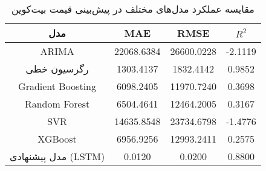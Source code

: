 
    \begin{table}[H]
        \centering
        \begin{tabular}{|c|c|c|c|}
            \hline
            \textbf{مدل} & \textbf{MAE} & \textbf{RMSE} & \textbf{ \(R^2\) } \\
            \hline
            ARIMA & 22068.6384 & 26600.0228 & -2.1119 \\
            رگرسیون خطی & 1303.4137 & 1832.4142 & 0.9852 \\
            Gradient Boosting & 6098.2405 & 11970.7240 & 0.3698 \\
            Random Forest & 6504.4641 & 12464.2005 & 0.3167 \\
            SVR & 14635.8548 & 23734.6798 & -1.4776 \\
            XGBoost & 6956.9256 & 12993.2411 & 0.2575 \\
            مدل پیشنهادی (LSTM) & 0.0120 & 0.0200 & 0.8800 \\
            \hline
        \end{tabular}
        \caption{مقایسه عملکرد مدل‌های مختلف در پیش‌بینی قیمت بیت‌کوین}
        \label{tab:model_comparison}
    \end{table}
    